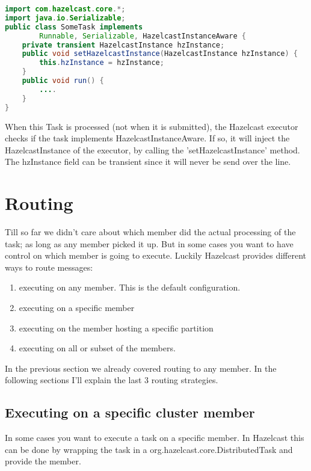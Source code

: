 \begin{lstlisting}[language=java]
import com.hazelcast.core.*;
import java.io.Serializable;
public class SomeTask implements
        Runnable, Serializable, HazelcastInstanceAware {
    private transient HazelcastInstance hzInstance;
    public void setHazelcastInstance(HazelcastInstance hzInstance) {
        this.hzInstance = hzInstance;
    }
    public void run() {
        ....
    }
}
\end{lstlisting}
When this Task is processed (not when it is submitted), the Hazelcast executor checks if the task implements HazelcastInstanceAware. If so, it will inject the HazelcastInstance of the executor, by calling the 'setHazelcastInstance' method. The hzInstance field can be transient since it will never be send over the line. 

\section{Routing}
Till so far we didn't care about which member did the actual processing of the task; as long as any member picked it up. But in some cases you want to have control on which member is going to execute. Luckily Hazelcast provides different ways to route messages:
\begin{enumerate}
\item executing on any member. This is the default configuration.
\item executing on a specific member
\item executing on the member hosting a specific partition
\item executing on all or subset of the members.
\end{enumerate}
In the previous section we already covered routing to any member. In the following sections I'll explain the last 3 routing strategies.

\subsection{Executing on a specific cluster member}
In some cases you want to execute a task on a specific member. In Hazelcast this can be done by wrapping the task in a org.hazelcast.core.DistributedTask and provide the member.

